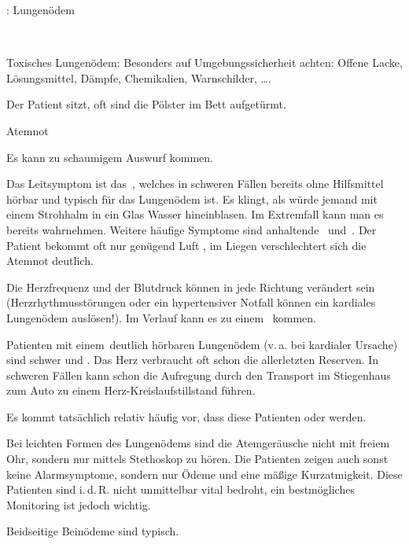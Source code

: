 {\TxABCDE: Lungenödem}
{~
\begin{ABCDEText}
  \item[\ABCDE{1}] Toxisches Lungenödem: Besonders auf
  Umgebungssicherheit achten: Offene Lacke,
  Lösungsmittel, Dämpfe, Chemikalien, Warnschilder, \ldots.
  \item[\ABCDE{2}] Der Patient sitzt, oft sind die Pölster
  im Bett aufgetürmt.
  \item[\ABCDE{4}] Atemnot
  \item[\ABCDE{A}] Es kann zu schaumigem Auswurf kommen.
  \item[\ABCDE{B}] %
  Das Leitsymptom ist das
  {\RedFlag}\,, welches in
  schweren Fällen bereits ohne Hilfsmittel hörbar und
  typisch für das Lungenödem ist. Es klingt, als würde jemand
  mit einem Strohhalm in ein Glas Wasser hineinblasen. Im
  Extremfall kann man es bereits  wahrnehmen.
  Weitere häufige Symptome sind anhaltende {\RedFlag}\, und
  {\RedFlag}\,.
  Der Patient bekommt oft nur  genügend
  Luft , im Liegen verschlechtert sich die
  Atemnot deutlich.
  \item[\ABCDE{C}] Die Herzfrequenz und der Blutdruck können
  in jede Richtung verändert sein (Herzrhythmusstörungen
  oder ein hypertensiver Notfall können ein kardiales
  Lungenödem auslösen!). Im Verlauf kann es zu einem
  {\RedFlag}\, kommen.
  \item[\ABCDE{=}] Patienten mit einem {\RedFlag}\,deutlich
  hörbaren Lungenödem (v.\,a. bei kardialer Ursache) sind schwer und . Das Herz verbraucht oft schon die allerletzten Reserven. In
  schweren Fällen kann schon die Aufregung durch den Transport
  im Stiegenhaus zum Auto zu einem Herz-Kreislaufstillstand
  führen.
  
  Es kommt tatsächlich relativ häufig vor, dass diese
  Patienten  oder 
   werden. 
  
  Bei leichten Formen des Lungenödems sind die
  Atemgeräusche nicht mit freiem Ohr, sondern
  nur mittels Stethoskop zu hören.  Die Patienten zeigen auch
  sonst keine Alarmsymptome, sondern nur Ödeme und eine mäßige
  Kurzatmigkeit. Diese Patienten sind i.\,d.\,R. nicht
  unmittelbar vital bedroht, ein bestmögliches Monitoring ist jedoch wichtig.
  \item[\ABCDE{\ldots}] Beidseitige Beinödeme sind typisch.
\end{ABCDEText}
}
